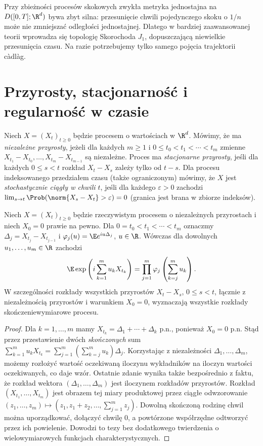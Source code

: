 \begin{uwaga}
Przy zbieżności procesów skokowych zwykła metryka
jednostajna na $D([0,T];\R^d)$ bywa zbyt silna:
przesunięcie chwili pojedynczego skoku o $1/n$
może nie zmniejszać odległości jednostajnej.
Dlatego w bardziej zaawansowanej teorii wprowadza się
topologię Skorochoda $J_1$, dopuszczającą niewielkie
przesunięcia czasu. Na razie potrzebujemy tylko
samego pojęcia trajektorii c\`adl\`ag.
\end{uwaga}

\section{Przyrosty, stacjonarność i regularność w czasie}
\begin{definicja}[Przyrosty]
Niech $X=(X_t)_{t\ge0}$ będzie procesem o wartościach w $\R^d$.
Mówimy, że ma \emph{niezależne przyrosty}, jeżeli dla
każdych $m\ge1$ i $0\le t_0<t_1<\cdots<t_m$
zmienne $X_{t_1}-X_{t_0},\ldots,X_{t_m}-X_{t_{m-1}}$
są niezależne. Proces ma \emph{stacjonarne przyrosty}, jeśli
dla każdych $0\le s<t$ rozkład $X_t-X_s$ zależy tylko od $t-s$.
Dla procesu indeksowanego przedziałem czasu (także
ograniczonym) mówimy, że $X$ jest
\emph{stochastycznie ciągły w chwili $t$},
jeśli dla każdego $\varepsilon>0$ zachodzi
$\lim_{s\to t}\Prob(\norm{X_s-X_t}>\varepsilon)=0$
(granica jest brana w zbiorze indeksów).
\end{definicja}


\begin{twierdzenie}
Niech $X=(X_t)_{t\ge0}$ będzie rzeczywistym procesem
o niezależnych przyrostach i niech $X_0=0$ prawie na pewno.
Dla $0=t_0<t_1<\cdots<t_m$ oznaczmy
$\Delta_j=X_{t_j}-X_{t_{j-1}}$ i
$\varphi_j(u)=\E e^{iu\Delta_j}$, $u\in\R$.
Wówczas dla dowolnych $u_1,\ldots,u_m\in\R$ zachodzi
\[
\E\exp\left(i\sum_{k=1}^m u_k X_{t_k}\right)
=\prod_{j=1}^m\varphi_j\left(\sum_{k=j}^m u_k\right).
\]
W szczególności rozkłady wszystkich przyrostów
$X_t-X_s$, $0\le s<t$, łącznie z niezależnością
przyrostów i warunkiem $X_0=0$, wyznaczają
wszystkie rozkłady skończeniewymiarowe procesu.
\end{twierdzenie}
\begin{proof}
Dla $k=1,\ldots,m$ mamy
$X_{t_k}=\Delta_1+\cdots+\Delta_k$ p.n.,
ponieważ $X_0=0$ p.n.
Stąd przez przestawienie dwóch \emph{skończonych} sum
$\sum_{k=1}^m u_k X_{t_k}
=\sum_{j=1}^m(\sum_{k=j}^m u_k)\Delta_j$.
Korzystając z niezależności $\Delta_1,\ldots,\Delta_m$,
możemy rozłożyć wartość oczekiwaną iloczynu
wykładników na iloczyn wartości oczekiwanych,
co daje wzór. Ostatnie zdanie wynika także bezpośrednio
z faktu, że rozkład wektora $(\Delta_1,\ldots,\Delta_m)$
jest iloczynem rozkładów przyrostów.
Rozkład $(X_{t_1},\ldots,X_{t_m})$ jest obrazem
tej miary produktowej przez ciągłe odwzorowanie
$(z_1,\ldots,z_m)\mapsto(z_1,z_1+z_2,\ldots,\sum_{j=1}^m z_j)$.
Dowolną skończoną rodzinę chwil można uporządkować,
dołączyć chwilę $0$, a powtórzone współrzędne
odtworzyć przez ich powielenie. Dowodzi to tezy
bez dodatkowego twierdzenia o wielowymiarowych
funkcjach charakterystycznych.
\end{proof}

